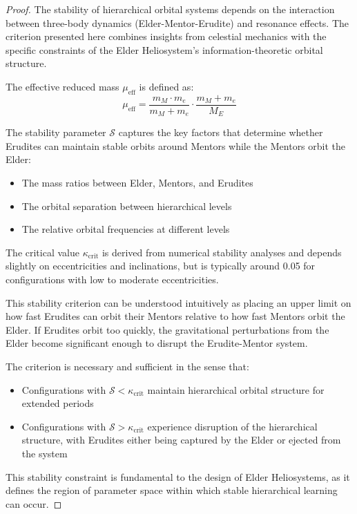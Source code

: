\begin{proof}
The stability of hierarchical orbital systems depends on the interaction between three-body dynamics (Elder-Mentor-Erudite) and resonance effects. The criterion presented here combines insights from celestial mechanics with the specific constraints of the Elder Heliosystem's information-theoretic orbital structure.

The effective reduced mass $\mu_{\text{eff}}$ is defined as:
\begin{equation}
\mu_{\text{eff}} = \frac{m_M \cdot m_e}{m_M + m_e} \cdot \frac{m_M + m_e}{M_E}
\end{equation}

The stability parameter $\mathcal{S}$ captures the key factors that determine whether Erudites can maintain stable orbits around Mentors while the Mentors orbit the Elder:
\begin{itemize}
    \item The mass ratios between Elder, Mentors, and Erudites
    \item The orbital separation between hierarchical levels
    \item The relative orbital frequencies at different levels
\end{itemize}

The critical value $\kappa_{\text{crit}}$ is derived from numerical stability analyses and depends slightly on eccentricities and inclinations, but is typically around 0.05 for configurations with low to moderate eccentricities.

This stability criterion can be understood intuitively as placing an upper limit on how fast Erudites can orbit their Mentors relative to how fast Mentors orbit the Elder. If Erudites orbit too quickly, the gravitational perturbations from the Elder become significant enough to disrupt the Erudite-Mentor system.

The criterion is necessary and sufficient in the sense that:
\begin{itemize}
    \item Configurations with $\mathcal{S} < \kappa_{\text{crit}}$ maintain hierarchical orbital structure for extended periods
    \item Configurations with $\mathcal{S} > \kappa_{\text{crit}}$ experience disruption of the hierarchical structure, with Erudites either being captured by the Elder or ejected from the system
\end{itemize}

This stability constraint is fundamental to the design of Elder Heliosystems, as it defines the region of parameter space within which stable hierarchical learning can occur.
\end{proof}

